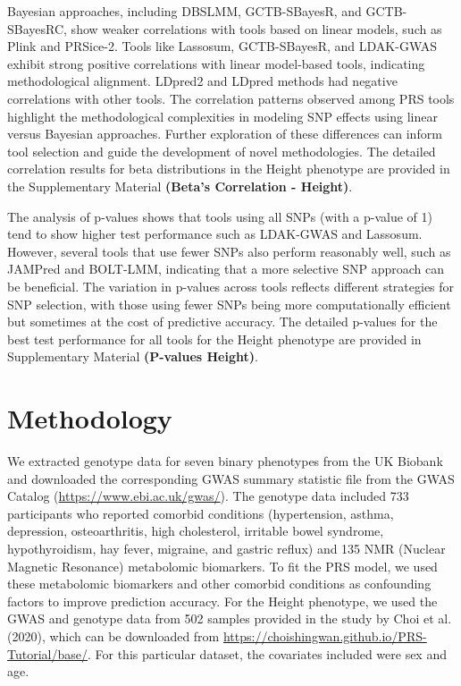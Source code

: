 \documentclass[pdflatex,sn-nature]{sn-jnl}%
\begin{document}
Bayesian approaches, including DBSLMM, GCTB-SBayesR, and GCTB-SBayesRC, show weaker correlations with tools based on linear models, such as Plink and PRSice-2. Tools like Lassosum, GCTB-SBayesR, and LDAK-GWAS exhibit strong positive correlations with linear model-based tools, indicating methodological alignment. LDpred2 and LDpred methods had negative correlations with other tools. The correlation patterns observed among PRS tools highlight the methodological complexities in modeling SNP effects using linear versus Bayesian approaches. Further exploration of these differences can inform tool selection and guide the development of novel methodologies. The detailed correlation results for beta distributions in the Height phenotype are provided in the Supplementary Material \textbf{(Beta's Correlation - Height)}.


The analysis of p-values shows that tools using all SNPs (with a p-value of 1) tend to show higher test performance such as LDAK-GWAS and Lassosum. However, several tools that use fewer SNPs also perform reasonably well, such as JAMPred and BOLT-LMM, indicating that a more selective SNP approach can be beneficial. The variation in p-values across tools reflects different strategies for SNP selection, with those using fewer SNPs being more computationally efficient but sometimes at the cost of predictive accuracy. The detailed p-values for the best test performance for all tools for the Height phenotype are provided in Supplementary Material \textbf{(P-values Height)}.


\section*{Methodology}
\label{Methodology}
We extracted genotype data for seven binary phenotypes from the UK Biobank and downloaded the corresponding GWAS summary statistic file from the GWAS Catalog (\url{https://www.ebi.ac.uk/gwas/}). The genotype data included 733 participants who reported comorbid conditions (hypertension, asthma, depression, osteoarthritis, high cholesterol, irritable bowel syndrome, hypothyroidism, hay fever, migraine, and gastric reflux) and 135 NMR (Nuclear Magnetic Resonance) metabolomic biomarkers. To fit the PRS model, we used these metabolomic biomarkers and other comorbid conditions as confounding factors to improve prediction accuracy. For the Height phenotype, we used the GWAS and genotype data from 502 samples provided in the study by Choi et al. (2020), which can be downloaded from \url{https://choishingwan.github.io/PRS-Tutorial/base/}. For this particular dataset, the covariates included were sex and age. 
\end{document}
